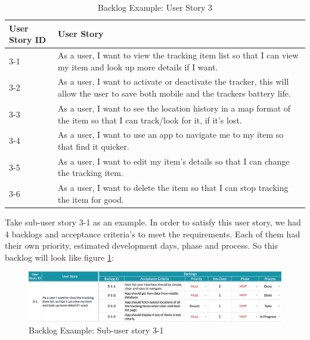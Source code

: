 \documentclass[12pt,a4paper]{article}
\begin{document}
          \begin{table}[H]
            \centering
              \begin{tabularx}{\textwidth}{l X}
                \hline
                 User Story ID & User Story \\ \hline
                 3-1 & As a user, I want to view the tracking item list so that I can view my item and look up more details if I want. \\
                 3-2 & As a user, I want to activate or deactivate the tracker, this will allow the user to save both mobile and the trackers battery life. \\
                 3-3 & As a user, I want to see the location history in a map format of the item so that I can track/look for it, if it's lost. \\
                 3-4 & As a user, I want to use an app to navigate me to my item so that find it quicker. \\
                 3-5 & As a user, I want to edit my item's details so that I can change the tracking item. \\
                 3-6 & As a user, I want to delete the item so that I can stop tracking the item for good. \\
                \hline
              \end{tabularx}
              \caption[Table caption text]{Backlog Example: User Story 3}
              \label{table:Backlog Example: User Story 3}
          \end{table}   
          
          Take sub-user story 3-1 as an example. In order to satisfy this user story, we had 4 backlogs and acceptance criteria's to meet the requirements. Each of them had their own priority, estimated development days, phase and process. So this backlog will look like figure \ref{fig:Backlog Example: Sub-user story 3-1}:
          
          \begin{figure}[H]
            \centering
            \includegraphics[width=1\textwidth]{../assets/development-records-backlog-example.png}
            \caption{Backlog Example: Sub-user story 3-1}
            \label{fig:Backlog Example: Sub-user story 3-1}
          \end{figure}
          
\end{document}
